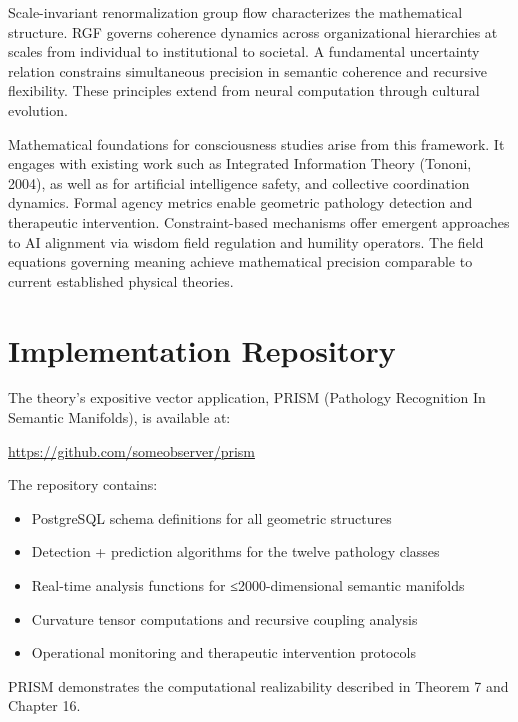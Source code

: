\documentclass[11pt, a4paper]{report}
\begin{document}
Scale-invariant renormalization group flow characterizes the mathematical structure. RGF governs coherence dynamics across organizational hierarchies at scales from individual to institutional to societal. A fundamental uncertainty relation constrains simultaneous precision in semantic coherence and recursive flexibility. These principles extend from neural computation through cultural evolution.

Mathematical foundations for consciousness studies arise from this framework. It engages with existing work such as Integrated Information Theory (Tononi, 2004), as well as for artificial intelligence safety, and collective coordination dynamics. Formal agency metrics enable geometric pathology detection and therapeutic intervention. Constraint-based mechanisms offer emergent approaches to AI alignment via wisdom field regulation and humility operators. The field equations governing meaning achieve mathematical precision comparable to current established physical theories.

\tableofcontents

















\appendix
\chapter{Implementation Repository}
\label{appendix:implementation}

The theory's expositive vector application, PRISM (Pathology Recognition In Semantic Manifolds), is available at:

\begin{center}
\url{https://github.com/someobserver/prism}
\end{center}

The repository contains:
\begin{itemize}
\item PostgreSQL schema definitions for all geometric structures
\item Detection + prediction algorithms for the twelve pathology classes
\item Real-time analysis functions for ≤2000-dimensional semantic manifolds
\item Curvature tensor computations and recursive coupling analysis
\item Operational monitoring and therapeutic intervention protocols
\end{itemize}

PRISM demonstrates the computational realizability described in Theorem 7 and Chapter 16.

\printbibliography
\end{document}
